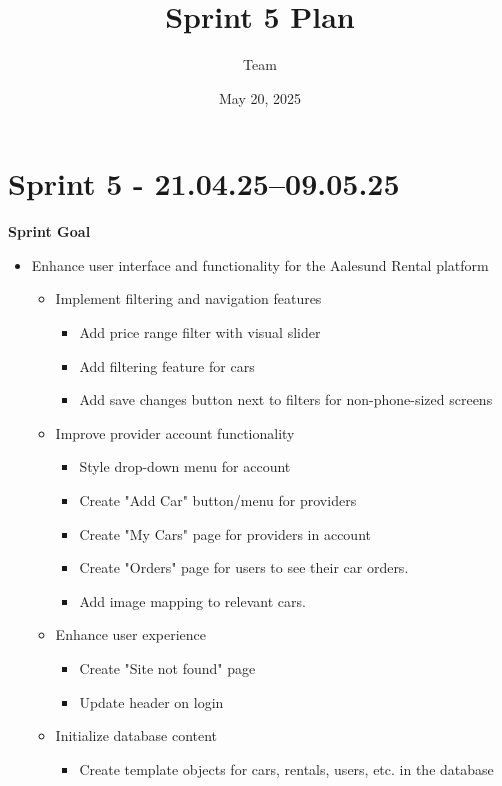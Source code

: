 \documentclass[a4paper,12pt]{article}
\title{Sprint 5 Plan}
\author{Team}
\date{May 20, 2025}
\begin{document}
\maketitle

\section*{Sprint 5 - 21.04.25--09.05.25}
\textbf{Sprint Goal}

\begin{itemize}
    \item Enhance user interface and functionality for the Aalesund Rental platform
    \begin{itemize}
        \item Implement filtering and navigation features
        \begin{itemize}
            \item Add price range filter with visual slider
            \item Add filtering feature for cars
            \item Add save changes button next to filters for non-phone-sized screens
        \end{itemize}
        \item Improve provider account functionality
        \begin{itemize}
            \item Style drop-down menu for account
            \item Create "Add Car" button/menu for providers
            \item Create "My Cars" page for providers in account
            \item Create "Orders" page for users to see their car orders.
            \item Add image mapping to relevant cars.
        \end{itemize}
        \item Enhance user experience
        \begin{itemize}
            \item Create "Site not found" page
            \item Update header on login
        \end{itemize}
        \item Initialize database content
        \begin{itemize}
            \item Create template objects for cars, rentals, users, etc. in the database
        \end{itemize}
    \end{itemize}
\end{itemize}
\end{document}
